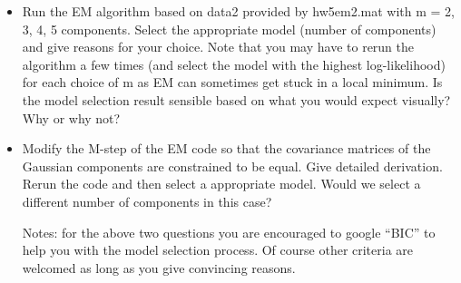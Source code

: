 \documentclass{article}
\theoremstyle{definition}
\theoremstyle{definition}
\theoremstyle{remark}
\begin{document}
\begin{itemize}
  \item Run the EM algorithm based on data2 provided by hw5em2.mat with m =
2, 3, 4, 5 components. Select the appropriate model (number of components) and give reasons for your choice. Note that you may have to rerun the algorithm a few times
(and select the model with the highest log-likelihood) for each choice of m as EM can
sometimes get stuck in a local minimum. Is the model selection result sensible based
on what you would expect visually? Why or why not?
  \item Modify the M-step of the EM code so that the covariance matrices of
the Gaussian components are constrained to be equal. Give detailed derivation. Rerun the code and then select a appropriate model. Would we select a different number of components in this case?

Notes: for the above two questions you are encouraged to google ``BIC'' to help you with the model selection process. Of course other criteria are welcomed as long as you give convincing reasons.
\end{itemize}


\end{document}
